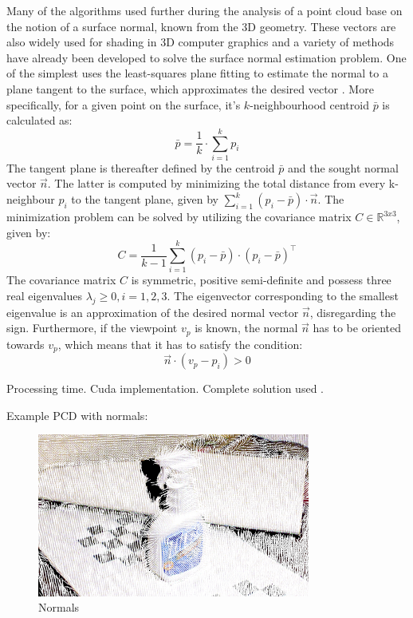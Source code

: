 Many of the algorithms used further during the analysis of a point cloud base on the notion of a surface normal, known from the 3D geometry. These vectors are also widely used for shading in 3D computer graphics and a variety of methods have already been developed to solve the surface normal estimation problem. One of the simplest uses the least-squares plane fitting to estimate the normal to a plane tangent to the surface, which approximates the desired vector \cite{rusuthesis}. More specifically, for a given point on the surface, it's $k$-neighbourhood centroid $\bar{p}$ is calculated as:
\begin{equation} 
\bar{p} = \frac{1}{k} \cdot \sum\limits_{i=1}^{k} p_i 
\end{equation}
The tangent plane is thereafter defined by the centroid $\bar{p}$ and the sought normal vector $\vec{n}$. The latter is computed by minimizing the total distance from every k-neighbour $p_i$ to the tangent plane, given by $\sum\limits_{i=1}^{k} (p_i - \bar{p})\cdot \vec{n}$. The minimization problem can be solved by utilizing the covariance matrix $C \in \mathbb{R}^{3x3}$, given by:
\begin{equation}
C = \frac{1}{k-1}\sum\limits_{i=1}^{k}(p_i - \bar{p})\cdot (p_i - \bar{p})^\intercal
\end{equation}
The covariance matrix $C$ is symmetric, positive semi-definite and possess three real eigenvalues $\lambda_j \geq 0, i = 1,2,3$. The eigenvector corresponding to the smallest eigenvalue is an approximation of the desired normal vector $\vec{n}$, disregarding the sign. Furthermore, if the viewpoint $v_p$ is known, the normal $\vec{n}$ has to be oriented towards  $v_p$, which means that it has to satisfy the condition:
\begin{equation}
\vec{n}\cdot(v_p-p_i) > 0
\end{equation}


Processing time. Cuda implementation. Complete solution used \cite{eigenvalues3x3}.

Example PCD with normals:
\begin{figure}[h]
\centering
\includegraphics[width=0.8\textwidth]{fig/Normal}
\caption{ Normals }
\label{fig:normals}
\end{figure}

